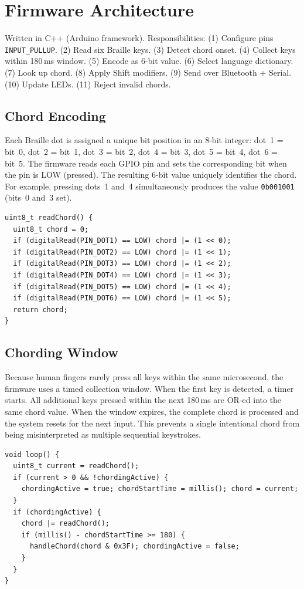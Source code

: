 \documentclass[11pt,a4paper,twoside]{article}
\begin{document}
\section{Firmware Architecture}

Written in C++ (Arduino framework). Responsibilities:
(1) Configure pins \texttt{INPUT\_PULLUP}. (2) Read six Braille keys.
(3) Detect chord onset. (4) Collect keys within 180\,ms window.
(5) Encode as 6-bit value. (6) Select language dictionary.
(7) Look up chord. (8) Apply Shift modifiers. (9) Send over Bluetooth + Serial.
(10) Update LEDs. (11) Reject invalid chords.

\subsection{Chord Encoding}
Each Braille dot is assigned a unique bit position in an 8-bit integer:
dot~1 = bit~0, dot~2 = bit~1, dot~3 = bit~2, dot~4 = bit~3, dot~5 = bit~4,
dot~6 = bit~5. The firmware reads each GPIO pin and sets the corresponding
bit when the pin is LOW (pressed). The resulting 6-bit value uniquely
identifies the chord. For example, pressing dots~1 and~4 simultaneously
produces the value \texttt{0b001001} (bits~0 and~3 set).

\begin{lstlisting}[caption=Reading GPIOs into a chord value.]
uint8_t readChord() {
  uint8_t chord = 0;
  if (digitalRead(PIN_DOT1) == LOW) chord |= (1 << 0);
  if (digitalRead(PIN_DOT2) == LOW) chord |= (1 << 1);
  if (digitalRead(PIN_DOT3) == LOW) chord |= (1 << 2);
  if (digitalRead(PIN_DOT4) == LOW) chord |= (1 << 3);
  if (digitalRead(PIN_DOT5) == LOW) chord |= (1 << 4);
  if (digitalRead(PIN_DOT6) == LOW) chord |= (1 << 5);
  return chord;
}
\end{lstlisting}

\subsection{Chording Window}
Because human fingers rarely press all keys within the same microsecond,
the firmware uses a timed collection window. When the first key is
detected, a timer starts. All additional keys pressed within the next
180\,ms are OR-ed into the same chord value. When the window expires,
the complete chord is processed and the system resets for the next input.
This prevents a single intentional chord from being misinterpreted as
multiple sequential keystrokes.

\begin{lstlisting}[caption=Chord detection with 180\,ms window.]
void loop() {
  uint8_t current = readChord();
  if (current > 0 && !chordingActive) {
    chordingActive = true; chordStartTime = millis(); chord = current;
  }
  if (chordingActive) {
    chord |= readChord();
    if (millis() - chordStartTime >= 180) {
      handleChord(chord & 0x3F); chordingActive = false;
    }
  }
}
\end{lstlisting}
\end{document}

